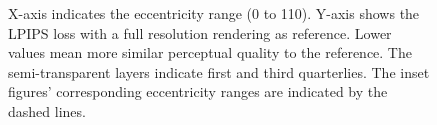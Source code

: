 \begin{figure}[ht]
    {%
    X-axis indicates the eccentricity range ($0$ to 110). Y-axis shows the LPIPS loss \cite{zhang2018unreasonable} with a full resolution rendering as reference. Lower values mean more similar perceptual quality to the reference. The semi-transparent layers indicate first and third quarterlies. The inset figures' corresponding eccentricity ranges are indicated by the dashed lines.
    }
    \label{fig:lpips}
\end{figure}